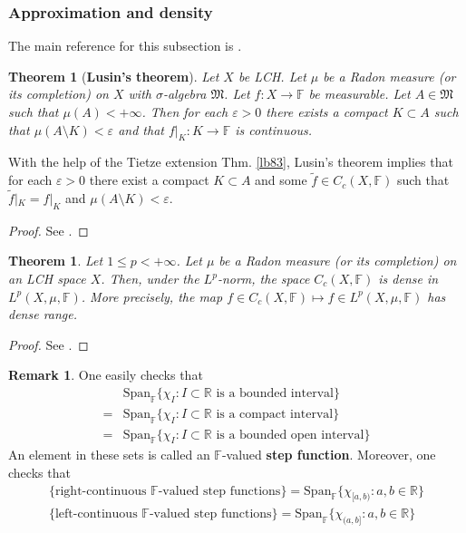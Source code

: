 \documentclass[12pt,b5paper,notitlepage]{article}
\theoremstyle{definition}
\newtheorem{rem}[df]{Remark}
\theoremstyle{plain}
\newtheorem{thm}[df]{Theorem}
\newcommand{\fk}{\mathfrak}
\newcommand{\wtd}{\widetilde}
\newcommand{\Span}{\mathrm{Span}}
\newcommand{\Rbb}{\mathbb R}
\newcommand{\Fbb}{\mathbb F}
\newcommand{\eps}{\varepsilon}
\numberwithin{equation}{section}
\begin{document}
\subsubsection{Approximation and density}

The main reference for this subsection is \cite[Sec. 27.2]{Gui-A}.








\begin{thm}[\textbf{Lusin's theorem}]\label{lb82}
Let $X$ be LCH. Let $\mu$ be a Radon measure (or its completion) on $X$ with $\sigma$-algebra $\fk M$. Let $f:X\rightarrow\Fbb$ be measurable. Let $A\in\fk M$ such that $\mu(A)<+\infty$. Then for each $\eps>0$ there exists a compact $K\subset A$ such that $\mu(A\setminus K)<\eps$ and that $f|_K:K\rightarrow\Fbb$ is continuous.
\end{thm}

With the help of the Tietze extension Thm. \ref{lb83}, Lusin's theorem implies that for each $\eps>0$ there exist a compact $K\subset A$ and some $\wtd f\in C_c(X,\Fbb)$ such that $\wtd f|_K=f|_K$ and $\mu(A\setminus K)<\eps$.

\begin{proof}
See \cite[Sec. 25.4]{Gui-A}.
\end{proof}


\begin{thm}\label{lb14}
Let $1\leq p<+\infty$. Let $\mu$ be a Radon measure (or its completion) on an LCH space $X$. Then, under the $L^p$-norm, the space $C_c(X,\Fbb)$ is dense in $L^p(X,\mu,\Fbb)$. More precisely, the map $f\in C_c(X,\Fbb)\mapsto f\in L^p(X,\mu,\Fbb)$ has dense range.
\end{thm}


\begin{proof}
See \cite[Sec. 27.2]{Gui-A}.
\end{proof}










\begin{rem}
One easily checks that
\begin{align*}
&\Span_\Fbb\{\chi_I:I\subset\Rbb\text{ is a bounded interval}\}\\
=&\Span_\Fbb\{\chi_I:I\subset\Rbb\text{ is a compact interval}\}\\
=&\Span_\Fbb\{\chi_I:I\subset\Rbb\text{ is a bounded open interval}\}
\end{align*}
An element in these sets is called an $\Fbb$-valued \textbf{step function}.  Moreover, one checks that
\begin{gather*}
\{\text{right-continuous $\Fbb$-valued step functions}\}=\Span_\Fbb\{\chi_{[a,b)}:a,b\in\Rbb\}\\
\{\text{left-continuous $\Fbb$-valued step functions}\}=\Span_\Fbb\{\chi_{(a,b]}:a,b\in\Rbb\}
\end{gather*}
\end{rem}
\end{document}
